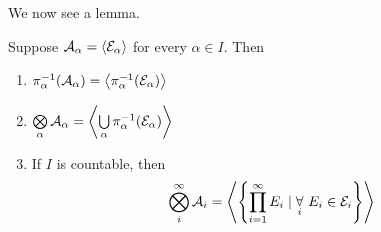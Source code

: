 We now see a lemma.
\begin{lemma}
	Suppose \(\mathcal{\MakeUppercase{a}} _\alpha  = \left< \mathcal{\MakeUppercase{e}} _\alpha  \right> \) for every \(\alpha \in I\). Then
	\begin{enumerate}
		\item \(\pi _\alpha ^{-1} (\mathcal{\MakeUppercase{a}} _\alpha ) = \left< \pi ^{-1} _\alpha (\mathcal{\MakeUppercase{e}} _\alpha ) \right> \)
		\item \(\bigotimes\limits_\alpha  \mathcal{\MakeUppercase{a}} _\alpha = \left< \bigcup\limits_{\alpha} \pi _\alpha ^{-1} (\mathcal{\MakeUppercase{e}} _\alpha )\right> \)
		\item If \(I\) is countable, then
		      \[
			      \bigotimes_i^{\infty }\mathcal{\MakeUppercase{a}} _i = \left< \left\{\prod\limits_{i=1}^{\infty} E_{i} \mid \underset{i}{\forall}\ E_{i}\in \mathcal{\MakeUppercase{e}} _{i}\right\} \right>
		      \]
	\end{enumerate}
\end{lemma}
